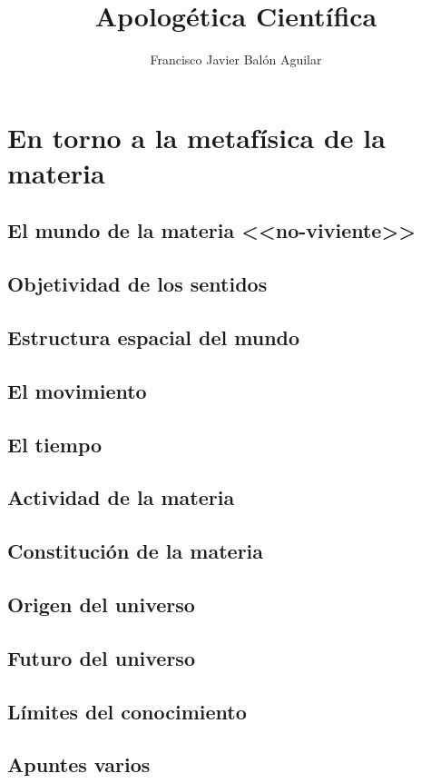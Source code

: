 \documentclass[11pt, oneside, titlepage]{book}
\title{\textbf{Apologética Científica}}
\author{Francisco Javier Balón Aguilar}
\begin{document}
\maketitle
\tableofcontents
\newpage

\chapter{En torno a la metafísica de la materia}

    \section{El mundo de la materia <<no-viviente>>}
    \section{Objetividad de los sentidos}
    \section{Estructura espacial del mundo}
    \section{El movimiento}
    \section{El tiempo}
    \section{Actividad de la materia}
    \section{Constitución de la materia}
    \section{Origen del universo}
    \section{Futuro del universo}
    \section{Límites del conocimiento}
    \section{Apuntes varios}
\end{document}
